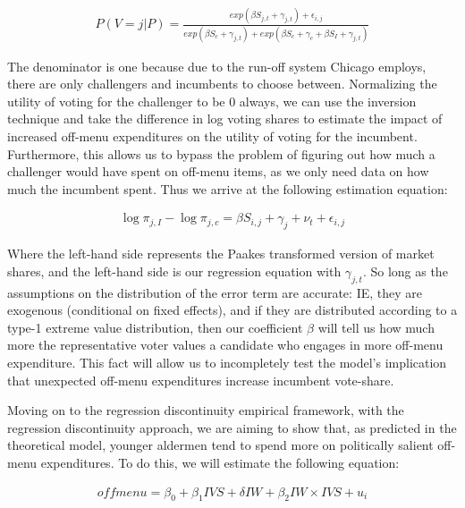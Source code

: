 \begin{align*}
    P(V=j|P)=\frac{exp( \beta S_{j,t} + \gamma_{j,t})+\epsilon_{i,j}}{exp(\beta S_c+\gamma_{j,t})+exp(\beta S_c+\gamma_c+\beta S_I+\gamma_{j,t})}
\end{align*}

The denominator is one because due to the run-off system Chicago employs, there are only challengers and incumbents to choose between. 
Normalizing the utility of voting for the challenger to be 0 always, we can use the inversion technique \cite{berry1994} and take the difference in log voting shares to estimate the impact of increased off-menu expenditures on the utility of voting for the incumbent. 
Furthermore, this allows us to bypass the problem of figuring out how much a challenger would have spent on off-menu items, as we only need data on how much the incumbent spent. 
Thus we arrive at the following estimation equation:

\begin{align*}
    \log \pi_{j,I}- \log \pi_{j,c}= \beta S_{i,j}+ \gamma_{j}+\nu_{t}+\epsilon_{i,j}
\end{align*}

Where the left-hand side represents the Paakes transformed version of market shares, and the left-hand side is our regression equation with $\gamma_{j,t}$. 
So long as the assumptions on the distribution of the error term are accurate: IE, they are exogenous (conditional on fixed effects), and if they are distributed according to a type-1 extreme value distribution, then our coefficient $\beta$ will tell us how much more the representative voter values a candidate who engages in more off-menu expenditure. 
This fact will allow us to incompletely test the model's implication that unexpected off-menu expenditures increase incumbent vote-share.


Moving on to the regression discontinuity empirical framework, with the regression discontinuity approach, we are aiming to show that, as predicted in the theoretical model, younger aldermen tend to spend more on politically salient off-menu expenditures. 
To do this, we will estimate the following equation:

\begin{align*}
    offmenu=\beta_0+\beta_1 IVS + \delta IW + \beta_2 IW\times IVS+u_i
\end{align*}

